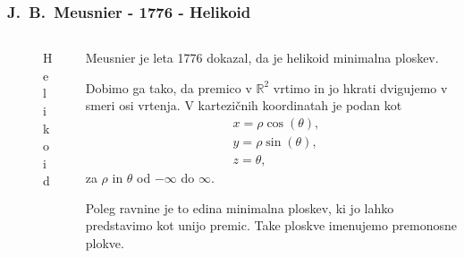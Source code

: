 \documentclass[8pt]{beamer}
\newcommand{\samplescalar}{50} %
\theoremstyle{definition}
\theoremstyle{remark}
\theoremstyle{plain}
\numberwithin{equation}{section}  %
\begin{document}
\begin{frame}
    \frametitle{J.~B.~Meusnier - 1776 - Helikoid}
    \begin{columns}
        \begin{column}{0.5\textwidth}
            \centering
            \begin{figure}[H]
                \centering
            
                \caption{Helikoid}
            \end{figure}
        \end{column}

        \begin{column}{0.5\textwidth}
            Meusnier je leta 1776 dokazal, da je helikoid minimalna ploskev. 
            
            \vspace{0.8em}

            Dobimo ga tako, da premico v $\mathbb{R}^2$ vrtimo in jo hkrati dvigujemo v smeri osi vrtenja. V kartezičnih koordinatah je podan kot
            \begin{align*}
                & x=\rho \cos (\theta), \\
                & y=\rho \sin (\theta), \\
                & z=\theta,
            \end{align*}
            za $\rho$ in $\theta$ od $-\infty$ do $\infty$.

            \vspace{0.8em}
            
            Poleg ravnine je to edina minimalna ploskev, ki jo lahko predstavimo kot unijo premic. Take ploskve imenujemo \textcolor{red1}{premonosne plokve}.
            
        \end{column}
    \end{columns}
\end{frame}
\end{document}
